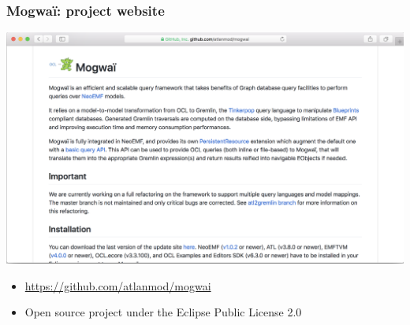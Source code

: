 \documentclass[10pt]{beamer}
\begin{document}
\begin{frame}[c]\frametitle{Mogwa\"i: project website}
    \begin{center}
      \includegraphics[width=\textwidth]{mogwai-github.png}
    \end{center}
	
    \begin{itemize}
    \item \url{https://github.com/atlanmod/mogwai}
    \item Open source project under the Eclipse Public License 2.0
    \end{itemize}
\end{frame}
\end{document}
